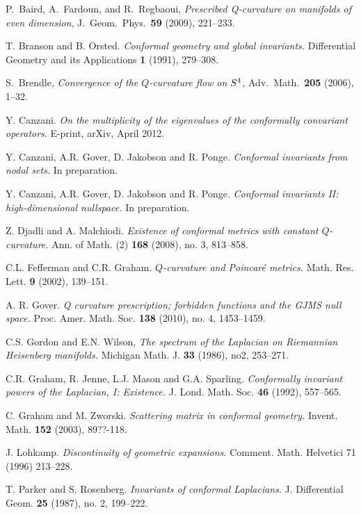 \documentclass{amsart}
\theoremstyle{definition}
\theoremstyle{remark}
\begin{document}
\begin{thebibliography}{1}

 P.\ Baird, A.\ Fardoun, and R.\ Regbaoui, {\em
    Prescribed Q-curvature on manifolds of even dimension}, J.\ Geom.\
  Phys.\ {\bf 59} (2009), 221--233.

  T. Branson and B. Orsted. {\em Conformal geometry
   and global invariants.}  Differential Geometry and its Applications
   \textbf{1} (1991), 279--308.

 S.\ Brendle, {\em Convergence of the $Q$-curvature flow
  on $S\sp 4$},  Adv.\ Math.\  {\bf 205} (2006), 1--32.

  Y. Canzani. \emph{On the multiplicity of the eigenvalues of the conformally convariant operators}. 
E-print, arXiv, April 2012. 
        

 Y. Canzani, A.R. Gover, D. Jakobson and R. Ponge. 
{\em Conformal invariants 
from nodal sets.} In preparation.  

 Y. Canzani, A.R. Gover, D. Jakobson and R. Ponge. 
{\em Conformal invariants II: 
high-dimensional nullspace.} 
In preparation. 

 Z. Djadli and A. Malchiodi. {\em Existence of
  conformal metrics with constant $Q$-curvature.} Ann. of Math. (2)
  \textbf{168} (2008), no. 3, 813--858.

  C.L. Fefferman and C.R. Graham.  {\em $Q$-curvature
   and Poincar\'e metrics.}  Math. Res. Lett. \textbf{9} (2002),
   139--151.
 
 A. R. Gover. {\em Q curvature prescription; forbidden
functions and the GJMS null space.} Proc. Amer. Math. Soc. \textbf{138}
(2010), no. 4, 1453--1459.

 C.S. Gordon and E.N. Wilson, 
{\em The spectrum of the Laplacian on Riemannian Heisenberg manifolds.}
Michigan Math. J. \textbf{33} (1986), no2,  253--271.

 C.R. Graham, R. Jenne, L.J. Mason and G.A. Sparling.
{\em Conformally invariant powers of the Laplacian, I: Existence.}
J. Lond. Math. Soc. \textbf{46} (1992), 557--565.

  C. Graham and M. Zworski. {\em Scattering matrix in conformal
 geometry.}  Invent. Math. \textbf{152} (2003), 89??-118.

 J. Lohkamp. {\em Discontinuity of geometric expansions.}
Comment. Math. Helvetici 71 (1996) 213--228.

  T. Parker and S. Rosenberg.  \emph{Invariants of conformal Laplacians}. 
  J. Differential Geom. \textbf{25} (1987), no. 2, 199--222.

\end{thebibliography}
\end{document}
